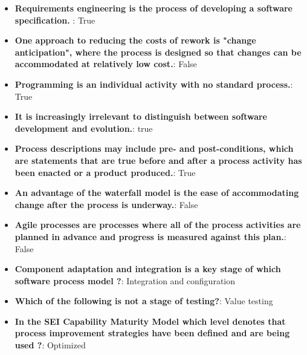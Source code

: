 \documentclass{report}
\begin{document}
    \pagebreak 
    \begin{itemize}
        \item \textbf{Requirements engineering is the process of developing a software specification.} : True
        \item \textbf{One approach to reducing the costs of rework is "change anticipation", where the process is designed so that changes can be accommodated at relatively low cost.}: False
        \item \textbf{Programming is an individual activity with no standard process.}: True
        \item \textbf{It is increasingly irrelevant to distinguish between software development and evolution.}: true
        \item \textbf{Process descriptions may include pre- and post-conditions, which are statements that are true before and after a process activity has been enacted or a product produced.}: True
        \item \textbf{An advantage of the waterfall model is the ease of accommodating change after the process is underway.}: False
        \item \textbf{Agile processes are processes where all of the process activities are planned in advance and progress is measured against this plan.}: False
        \item \textbf{Component adaptation and integration is a key stage of which software process model ?}: Integration and configuration
        \item \textbf{Which of the following is not a stage of testing?}: Value testing
        \item \textbf{In the SEI Capability Maturity Model which level denotes that process improvement strategies have been defined and are being used ?}: Optimized
    \end{itemize}
    
\end{document}
